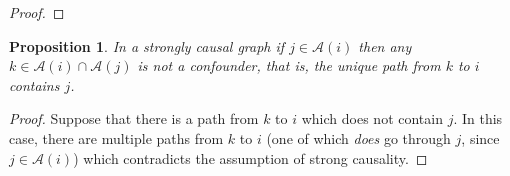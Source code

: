 \documentclass{statsoc}
\def\B{\mathsf{B}}  %
\def\A{\mathsf{A}}  %
\def\H{\mathcal{H}}  %
\newcommand{\linE}[2]{\hat{\E}[#1\ |\ #2]}  %
\newcommand{\anc}[1]{\mathcal{A}(#1)}  %
\newtheorem{proposition}{Proposition}
\def\H{\mathcal{H}}  %
\def\E{\mathbb{E}}  %
\newcommand{\inner}[2]{\langle #1, #2 \rangle}  %
\begin{document}
\begin{proof}






\end{proof}

\begin{proposition}
  \label{prop:sc_graph_common_anc}
  In a strongly causal graph if $j \in \anc{i}$ then any
  $k \in \anc{i} \cap \anc{j}$ is not a confounder, that is,
  the unique path from $k$ to $i$ contains $j$.
\end{proposition}
\begin{proof}
  Suppose that there is a path from $k$ to $i$ which does not contain
  $j$.  In this case, there are multiple paths from $k$ to $i$ (one of
  which \textit{does} go through $j$, since $j \in \anc{i}$) which
  contradicts the assumption of strong causality.
\end{proof}
\end{document}
